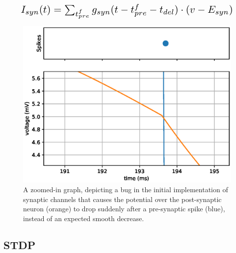 \begin{equation}\label{eq:presynapticfix}
    \scalebox{1.5}{$
        I_{syn}(t) = \sum_{t^f_{pre}} g_{syn}(t-t^f_{pre}-t_{del})\cdot(v-E_{syn})
    $}\end{equation}
\vspace{1ex}

\begin{figure}[ht]
    \centering
    \includegraphics[width=0.6\linewidth]{figures/graphs/bugZoomed.eps}
    \caption[Graph of a bug in the initial implementation of synaptic channels]{A zoomed-in graph, depicting a bug in the initial implementation of synaptic channels that causes the potential over the post-synaptic neuron (orange) to drop suddenly after a pre-synaptic spike (blue), instead of an expected smooth decrease.}
    \label{fig:LIFDUALBUG}
\end{figure}




\subsection{STDP}

